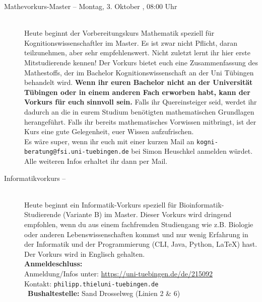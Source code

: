 \begin{description}

\ifkogwiss
    \ifmaster
        \item[Mathevorkurs-Master -- Montag, 3. Oktober \YEAR, 08:00 Uhr]\ \\
        Heute beginnt der Vorbereitungskurs Mathematik speziell für Kognitionswissenschaftler im Master. Es ist zwar nicht Pflicht, daran teilzunehmen, aber sehr empfehlenswert. Nicht zuletzt lernt ihr hier erste Mitstudierende kennen! Der Vorkurs bietet euch eine Zusammenfassung des Mathestoffs, der im Bachelor Kognitionswissenschaft an der Uni Tübingen behandelt wird.
        \textbf{Wenn ihr euren Bachelor nicht an der Universität Tübingen oder in einem anderen Fach erworben habt, kann der Vorkurs für euch sinnvoll sein.} Falls ihr Quereinsteiger seid, werdet ihr dadurch an die in eurem Studium benötigten mathematischen Grundlagen herangeführt. Falls ihr bereits mathematisches Vorwissen mitbringt, ist der Kurs eine gute Gelegenheit, euer Wissen aufzufrischen.\\
         Es wäre super, wenn ihr euch mit einer kurzen Mail an \texttt{kogni-beratung@fsi.uni-tuebingen.de} bei Simon Heuschkel anmelden würdet. Alle weiteren Infos erhaltet ihr dann per Mail.
    \fi
\fi

\ifmaster
    \ifbinfo
        \item[Informatikvorkurs -- \bioinfoDatum~\YEAR]\ \\
		Heute beginnt ein Informatik-Vorkurs speziell für Bioinformatik-Studierende (Variante B) im Master. Dieser Vorkurs wird dringend empfohlen, wenn du aus einem fachfremden Studiengang wie z.B. Biologie oder anderen Lebenswissenschaften kommst und nur wenig Erfahrung in der Informatik und der Programmierung (CLI, Java, Python, \LaTeX) hast. Der Vorkurs wird in Englisch gehalten. \\
		\textbf{Anmeldeschluss:} \bioinfoAnmeldung\YEAR\\
		Anmeldung/Infos unter: \url{https://uni-tuebingen.de/de/215092}\\
		Kontakt: \texttt{philipp.thiel\At uni-tuebingen.de}\\
        ~\textbf{Bushaltestelle:} Sand Drosselweg (Linien 2 \& 6)
    \fi
\fi


\end{description}
